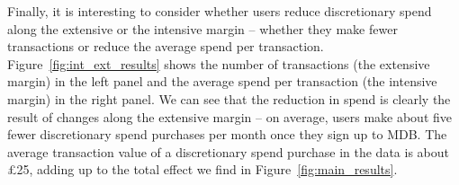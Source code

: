 Finally, it is interesting to consider whether users reduce discretionary spend
along the extensive or the intensive margin -- whether they make fewer
transactions or reduce the average spend per transaction.
Figure~\ref{fig:int_ext_results} shows the number of transactions (the
extensive margin) in the left panel and the average spend per transaction (the
intensive margin) in the right panel. We can see that the reduction in spend is
clearly the result of changes along the extensive margin -- on average, users
make about five fewer discretionary spend purchases per month once they sign up
to MDB. The average transaction value of a discretionary spend purchase in the
data is about \pounds25, adding up to the total effect we find in
Figure~\ref{fig:main_results}.

